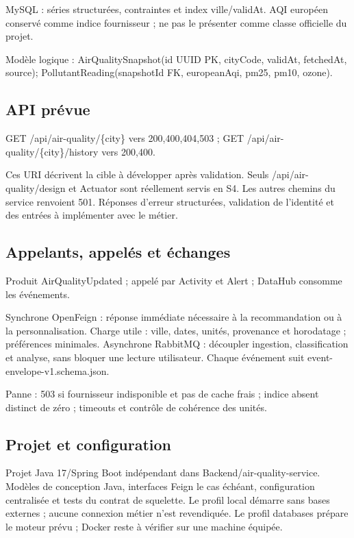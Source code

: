 \documentclass[10pt,a4paper]{article}
\begin{document}
MySQL : séries structurées, contraintes et index ville/validAt. AQI européen conservé comme indice fournisseur ; ne pas le présenter comme classe officielle du projet.\par

Modèle logique : AirQualitySnapshot(id UUID PK, cityCode, validAt, fetchedAt, source); PollutantReading(snapshotId FK, europeanAqi, pm25, pm10, ozone).\par

\subsection*{API prévue}

GET /api/air-quality/\{city\}  vers  200,400,404,503 ; GET /api/air-quality/\{city\}/history  vers  200,400.\par

Ces URI décrivent la cible à développer après validation. Seuls /api/air-quality/design et Actuator sont réellement servis en S4. Les autres chemins du service renvoient 501. Réponses d'erreur structurées, validation de l'identité et des entrées à implémenter avec le métier.\par

\subsection*{Appelants, appelés et échanges}

Produit AirQualityUpdated ; appelé par Activity et Alert ; DataHub consomme les événements.\par

Synchrone OpenFeign : réponse immédiate nécessaire à la recommandation ou à la personnalisation. Charge utile : ville, dates, unités, provenance et horodatage ; préférences minimales. Asynchrone RabbitMQ : découpler ingestion, classification et analyse, sans bloquer une lecture utilisateur. Chaque événement suit event-envelope-v1.schema.json.\par

Panne : 503 si fournisseur indisponible et pas de cache frais ; indice absent distinct de zéro ; timeouts et contrôle de cohérence des unités.\par

\subsection*{Projet et configuration}

Projet Java 17/Spring Boot indépendant dans Backend/air-quality-service. Modèles de conception Java, interfaces Feign le cas échéant, configuration centralisée et tests du contrat de squelette. Le profil local démarre sans bases externes ; aucune connexion métier n'est revendiquée. Le profil databases prépare le moteur prévu ; Docker reste à vérifier sur une machine équipée.\par
\clearpage
\end{document}
